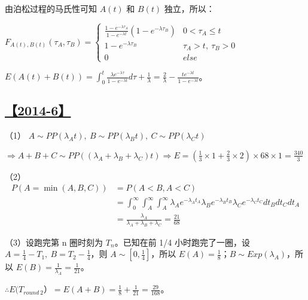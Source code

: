 由泊松过程的马氏性可知 $A(t)$ 和 $B(t)$ 独立，所以：

$F_{A(t),B(t)}(\tau_A, \tau_B)=\begin{cases}\frac{1-e^{-\lambda \tau_A}}{1-e^{-\lambda t}}(1-e^{-\lambda \tau_B}) & 0<\tau_A\le t\\1-e^{-\lambda \tau_B}&\tau_A>t,\ \tau_B>0\\0&else\end{cases}$

$E(A(t)+B(t))=\int_0^t\frac{\lambda e^{-\lambda\tau}}{1-e^{-\lambda t}}d\tau+\frac{1}{\lambda}=\frac{2}{\lambda}-\frac{te^{-\lambda t}}{1-e^{-\lambda t}}$。

\subsection{\hyperref[Q2014-6]{【2014-6】}}\label{A2014-6}

（1）
$A\sim PP(\lambda_At),\ B\sim PP(\lambda_Bt),\ C\sim PP(\lambda_Ct)$

$\Rightarrow A+B+C\sim PP((\lambda_A+\lambda_B+\lambda_C)t)\Rightarrow E=(\frac{1}{3}\times1+\frac{2}{3}\times2)\times68\times1=\frac{340}{3}$

（2）
\begin{equation}\tag*{}\begin{split}P(A=\min(A, B, C))&=P(A<B, A<C)\\&=\int_0^\infty\int_A^\infty\int_A^\infty\lambda_Ae^{-\lambda_At_A}\lambda_Be^{-\lambda_Bt_B}\lambda_Ce^{-\lambda_Ct_C}dt_Bdt_Cdt_A\\&=\frac{\lambda_A}{\lambda_A+\lambda_B+\lambda_C}=\frac{21}{68}\end{split}\end{equation}

（3）设跑完第 n 圈时刻为 $T_n$。已知在前 1/4 小时跑完了一圈，设 $A=\frac{1}{4}-T_1,\ B=T_2-\frac{1}{4}$，则 $A\sim [0, \frac{1}{4}]$，所以 $E(A)=\frac{1}{8}$；$B\sim Exp(\lambda_A)$，所以 $E(B)=\frac{1}{\lambda_A}=\frac{1}{21}$。

$\therefore E(T_{round\ 2}）=E(A+B)=\frac{1}{8}+\frac{1}{21}=\frac{29}{168}$。